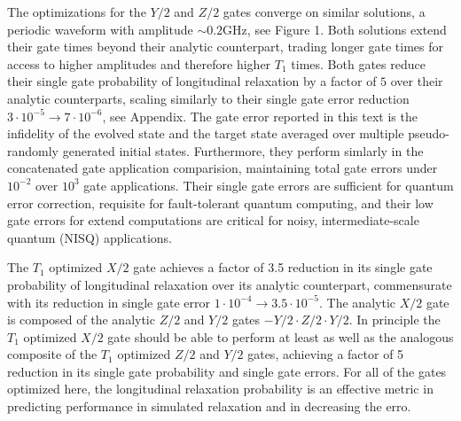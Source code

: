 \documentclass[
  amsfonts,
  amsmath,
  tbtags,
  amssymb,
  aps,
  nobibnotes,
  twocolumn,
  superscriptaddress,
]{revtex4-2}
\begin{document}
The optimizations for the $Y/2$ and $Z/2$ gates converge on similar solutions, a periodic
waveform with amplitude $\sim 0.2 \textrm{GHz}$, see Figure 1.
Both solutions extend their gate times
beyond their analytic counterpart, trading longer gate times for access
to higher amplitudes and therefore higher $T_{1}$ times. Both gates reduce
their single gate probability of longitudinal relaxation by a factor of $5$ over
their analytic counterparts, scaling similarly to their single gate error reduction
$3 \cdot 10^{-5} \rightarrow 7 \cdot 10^{-6}$, see Appendix.
The gate error reported in this text is the infidelity of the evolved state and the target state
averaged over multiple pseudo-randomly generated initial states.
Furthermore, they perform simlarly in
the concatenated gate application comparision, maintaining total gate errors under $10^{-2}$
over $10^{3}$ gate applications. Their single gate errors are sufficient for
quantum error correction, requisite for fault-tolerant quantum computing,
and their low gate errors for extend computations are critical for noisy, intermediate-scale
quantum (NISQ) applications.

The $T_{1}$ optimized $X/2$ gate achieves a factor of 3.5 reduction in
its single gate probability of longitudinal relaxation over its analytic
counterpart, commensurate with its
reduction in single gate error $1 \cdot 10^{-4} \rightarrow 3.5 \cdot 10^{-5}$.
The analytic $X/2$ gate is composed of the analytic $Z/2$ and $Y/2$ gates $-Y/2 \cdot Z/2 \cdot Y/2$.
In principle the $T_{1}$ optimized $X/2$ gate should be able to perform at least as well
as the analogous composite of the $T_{1}$ optimized $Z/2$ and $Y/2$ gates, achieving a factor
of 5 reduction in its single gate probability and single gate errors.
For all of the gates optimized here, the longitudinal relaxation probability is an effective
metric in predicting performance in simulated relaxation and in decreasing the erro.
\end{document}
